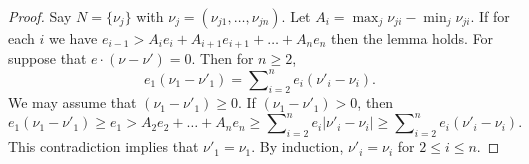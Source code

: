 \documentclass[10pt,a4paper]{amsart}
\theoremstyle{plain}
\theoremstyle{definition}
\theoremstyle{remark}
\numberwithin{equation}{subsection}
\begin{document}
\begin{proof}
Say $N = \{\nu_j\}$ with $\nu_j = (\nu_{j1}, \ldots, \nu_{jn})$.
Let $A_i = \max_j \nu_{ji} - \min_j \nu_{ji}$. If for each $i$ we have
$e_{i - 1} > A_ie_i + A_{i + 1}e_{i + 1} + \ldots + A_ne_n$ then
the lemma holds. For suppose that $e \cdot (\nu - \nu') = 0$. Then for
$n \ge 2$,
$$
e_1(\nu_1 - \nu'_1) = \sum\nolimits_{i = 2}^n e_i(\nu'_i - \nu_i).
$$
We may assume that $(\nu_1 - \nu'_1) \ge 0$. If $(\nu_1 - \nu'_1) > 0$, then
$$
e_1(\nu_1 - \nu'_1) \ge e_1 >
A_2e_2 + \ldots + A_ne_n \ge
\sum\nolimits_{i = 2}^n e_i|\nu'_i - \nu_i| \ge
\sum\nolimits_{i = 2}^n e_i(\nu'_i - \nu_i).
$$
This contradiction implies that $\nu'_1 = \nu_1$. By
induction, $\nu'_i = \nu_i$ for $2 \le i \le n$.
\end{proof}
\end{document}
